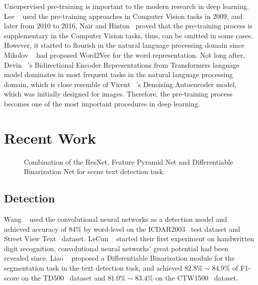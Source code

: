 \documentclass[review]{cvpr}
\begin{document}
  Unsupervised pre-training is important to the modern research in deep learning.
  Lee \etal~\cite{lee2009convolutional} used the pre-training approaches in Computer Vision tasks in 2009, and later from 2010 to 2016,
  Nair and Hinton~\cite{nair2010rectified} proved that the pre-training process is supplementary in the Computer Vision tasks,
  thus, can be omitted in some cases.
  However, it started to flourish in the natural language processing domain since Mikolov \etal~\cite{mikolov2013distributed} had proposed Word2Vec for the word representation.
  Not long after, Devin \etal~\cite{devlin2019bert}'s Bidirectional Encoder Representations from Transformers language model dominates
  in most frequent tasks in the natural language processing domain,
  which is close resemble of Vicent \etal~\cite{vincent2008extracting}'s Denoising Autoencoder model, which was initially designed for images.
  Therefore, the pre-training process becomes one of the most important procedures in deep learning.


\section{Recent Work}

\begin{figure*}
\begin{center}
\end{center}
   \caption{Combination of the ResNet, Feature Pyramid Net and Differentiable Binarization Net for scene text detection task.}
\label{fig:short}
\end{figure*}

\subsection{Detection}

  Wang \etal~\cite{wang2012end} used the convolutional neural networks as a detection model and achieved accuracy of 84\% by word-level on the ICDAR2003~\cite{lucas2003icdar} test dataset and Street View Text~\cite{wang2011end} dataset.
  LeCun \etal~\cite{lecun1990handwritten} started their first experiment on handwritten digit recognition, convolutional neural networks' great potential had been revealed since.
  Liao \etal~\cite{liao2020real} proposed a Differentiable Binarization module for the segmentation task in the text detection task, and achieved $82.8\%\sim84.9\%$ of F1-score on the TD500~\cite{yao2012detecting} dataset
   and $81.0\%\sim83.4\%$ on the CTW1500~\cite{liu2019curved} dataset.
\end{document}
